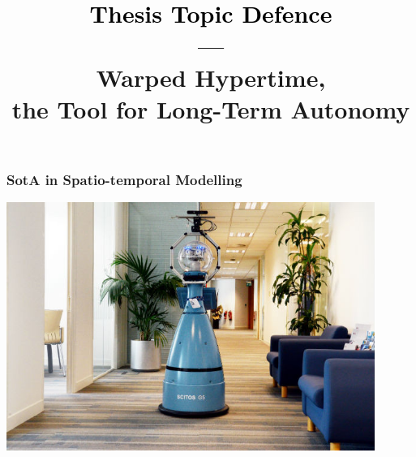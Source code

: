 \newcommand{\Subject}{\textcolor{black}{Thesis Topic Defence}\\{---}\\\LARGE{Warped Hypertime,\\[0.2em] the Tool for Long-Term Autonomy}}
\newcommand{\Meeting}{MESAS 2018, Prague}
\newcommand{\Author}{Tom{\'a}{\v s} Vintr}
\newcommand{\Authors}{Tom{\'a}{\v s} Vintr}
\newcommand{\Date}{}

\newcommand{\video}[2]{\href{run:#1}{\texttt{[image: \#2]}}}
\newcommand{\link}[2]{\href{run:#1}{\texttt{[image: \#2]}}}
\newcommand{\bib}[3]{\begin{thebibliography}{#1}\bibitem[#1]{#1}{#2}.\newblock{\em #3}\end{thebibliography}}

\newcommand{\Lincoln}{Artificial Intelligence Center\\Faculty of Electrical Engineering\\Czech Technical University}
\newcommand{\Institute}{\Lincoln\\}


\newcommand{\HeadLineLeft}{Tom{\'a}{\v s} Vintr}
\newcommand{\HeadLineCenter}{Thesis Topic Defence}
\newcommand{\HeadLineRight}{AIC@CTU}
\newcommand{\FootLineCenter}{Warped Hypertime, the Tool for Long-Term Autonomy}
\newcommand{\FootLineLeft}{\insertshortauthor}



\title{{\bf \Subject}}
\usepackage{multirow}


\frame{\titlepage}

\begin{frame}
	\frametitle{SotA in Spatio-temporal Modelling}
    \vspace{3mm}
    \includegraphics[width=0.9\textwidth]{fig/The-robot-Linda-at-Open-space-office-and-Bob-at-office-corridor.png}
\end{frame}


